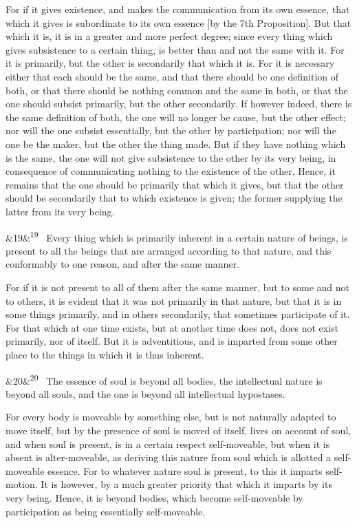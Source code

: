 \documentclass[12pt]{article}
\newcommand{\para}[1][]{\par\noindent\ifx&#1&\else\textsuperscript{\footnotesize #1}~\fi}
\begin{document}
For if it gives existence, and makes the communication from its own essence, that which it gives is subordinate to its own essence [by the 7th Proposition]. But that which it is, it is in a greater and more perfect degree; since every thing which gives subsistence to a certain thing, is better than and not the same with it. For it is primarily, but the other is secondarily that which it is. For it is necessary either that each should be the same, and that there should be one definition of both, or that there should be nothing common and the same in both, or that the one should subsist primarily, but the other secondarily. If however indeed, there is the same definition of both, the one will no longer be cause, but the other effect; nor will the one subsist essentially, but the other by participation; nor will the one be the maker, but the other the thing made. But if they have nothing which is the same, the one will not give subsistence to the other by its very being, in consequence of communicating nothing to the existence of the other. Hence, it remains that the one should be primarily that which it gives, but that the other should be secondarily that to which existence is given; the former supplying the latter from its very being.

\para[19] Every thing which is primarily inherent in a certain nature of beings, is present to all the beings that are arranged according to that nature, and this conformably to one reason, and after the same manner.

For if it is not present to all of them after the same manner, but to some and not to others, it is evident that it was not primarily in that nature, but that it is in some things primarily, and in others secondarily, that sometimes participate of it. For that which at one time exists, but at another time does not, does not exist primarily, nor of itself. But it is adventitious, and is imparted from some other place to the things in which it is thus inherent.

\para[20] The essence of soul is beyond all bodies, the intellectual nature is beyond all souls, and the one is beyond all intellectual hypostases.

For every body is moveable by something else, but is not naturally adapted to move itself, but by the presence of soul is moved of itself, lives on account of soul, and when soul is present, is in a certain respect self-moveable, but when it is absent is alter-moveable, as deriving this nature from soul which is allotted a self-moveable essence. For to whatever nature soul is present, to this it imparts self-motion. It is however, by a much greater priority that which it imparts by its very being. Hence, it is beyond bodies, which become self-moveable by participation as being essentially self-moveable.
\end{document}
